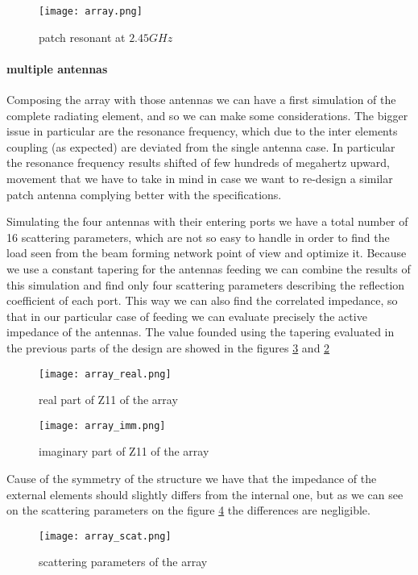 \begin{figure}[H]
	\centering
	\texttt{[image: array.png]}
	\caption{patch resonant at $2.45GHz$}
	\label{array}
\end{figure}

\paragraph{multiple antennas} Composing the array with those antennas we can have a first simulation of the complete radiating element, and so we can make some considerations. The bigger issue in particular are the resonance frequency, which due to the inter elements coupling (as expected) are deviated from the single antenna case. In particular the resonance frequency results shifted of few hundreds of megahertz upward, movement that we have to take in mind in case we want to re-design a similar patch antenna complying better with the specifications.

Simulating the four antennas with their entering ports we have a total number of 16 scattering parameters, which are not so easy to handle in order to find the load seen from the beam forming network point of view and optimize it. Because we use a constant tapering for the antennas feeding we can combine the results of this simulation and find only four scattering parameters describing the reflection coefficient of each port. This way we can also find the correlated impedance, so that in our particular case of feeding we can evaluate precisely the active impedance of the antennas. The value founded using the tapering evaluated in the previous parts of the design are showed in the figures \ref{array_real} and \ref{array_imm}
\begin{figure}[H]
	\centering
	\texttt{[image: array\_real.png]}
	\caption{real part of Z11 of the array}
	\label{array_imm}
\end{figure}
\begin{figure}[H]
	\centering
	\texttt{[image: array\_imm.png]}
	\caption{imaginary part of Z11 of the array}
	\label{array_real}
\end{figure}
Cause of the symmetry of the structure we have that the impedance of the external elements should slightly differs from the internal one, but as we can see on the scattering parameters on the figure \ref{array_scat} the differences are negligible.
\begin{figure}[H]
	\centering
	\texttt{[image: array\_scat.png]}
	\caption{scattering parameters of the array}
	\label{array_scat}
\end{figure}

